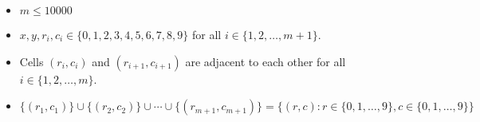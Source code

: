 \begin{itemize}
\tightlist
\item $m\le 10000$
\item $x,y,r_i,c_i\in\{0,1,2,3,4,5,6,7,8,9\}$ for all $i\in\{1,2,\ldots,m+1\}$. 
\item Cells $(r_i,c_i)$ and $(r_{i+1},c_{i+1})$ are adjacent to each other 
      for all $i\in\{1,2,\ldots,m\}$.
\item $\{(r_1,c_1)\}\cup\{(r_2,c_2)\}\cup\cdots\cup\{(r_{m+1},c_{m+1})\}=\{(r,c):r\in\{0,1,\dots,9\},c\in\{0,1,\dots,9\}\}$
\end{itemize}
